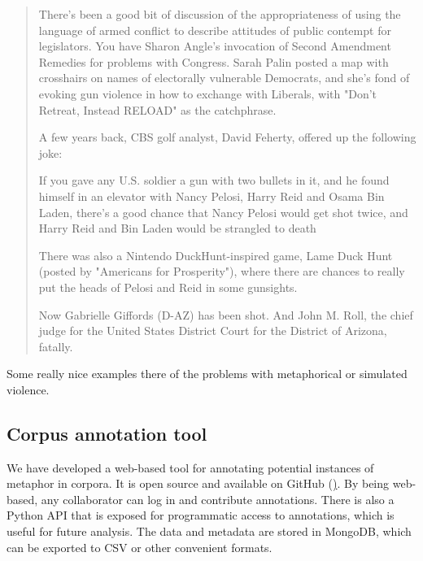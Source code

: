 \begin{quotation}
  There's been a good bit of discussion of the appropriateness of using the language of armed conflict to describe attitudes of public contempt for legislators.  You have Sharon Angle's invocation of  Second Amendment Remedies for problems with Congress.  Sarah Palin posted a map with crosshairs on names of electorally vulnerable Democrats, and she's fond of evoking gun violence in how to exchange with Liberals, with "Don't Retreat, Instead RELOAD" as the catchphrase. 

A few years back, CBS golf analyst, David Feherty, offered up the following joke:

If you gave any U.S. soldier a gun with two bullets in it, and he found himself in an elevator with Nancy Pelosi, Harry Reid and Osama Bin Laden, there's a good chance that Nancy Pelosi would get shot twice, and Harry Reid and Bin Laden would be strangled to death

There was also a Nintendo DuckHunt-inspired game, Lame Duck Hunt (posted by "Americans for Prosperity"), where there are chances to really put the heads of  Pelosi and  Reid in some gunsights.  

Now Gabrielle Giffords (D-AZ) has been shot.  And John M. Roll, the chief judge for the United States District Court for the District of Arizona, fatally.  
\end{quotation}

Some really nice examples there of the problems with metaphorical or 
simulated violence.




\subsection{Corpus annotation tool}
\label{sub:Corpus-annotation-tool}

We have developed a web-based tool for annotating potential instances of
metaphor in corpora. It is open source and available on GitHub 
(\href{http://github.com/mtpain/metacorps}). By being web-based, any collaborator
can log in and contribute annotations. There is also a Python API that is
exposed for programmatic access to annotations, which is useful for 
future analysis. The data and metadata are stored in MongoDB, which can be
exported to CSV or other convenient formats. 

